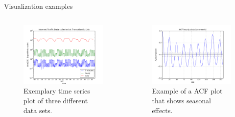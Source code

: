 \documentclass{beamer}
\begin{document}
  
  \begin{frame}{Visualization examples}   
    \begin{columns}[c]
      \begin{figure}
       \includegraphics[width=1.0\textwidth]{images/timeplot.png}
       \caption{Exemplary time series plot of three different data sets.}
      \end{figure}

        \begin{figure}
         \includegraphics[width=1.0\textwidth]{images/acf.png}
         \caption{Example of a ACF plot that shows seasonal effects.}
        \end{figure}
    \end{columns}
  \end{frame}
  
  
  
  
\end{document}
